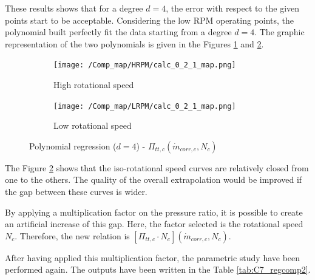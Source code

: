 These results shows that for a degree $d=4$, the error with respect to the given points start to be acceptable.  Considering the low RPM operating points, the polynomial built perfectly fit the data starting from a degree $d=4$. The graphic representation of the two polynomials is given in the Figures \ref{fig:C7_polycomp_P_HRPM} and \ref{fig:C7_polycomp_P_LRPM}.

\begin{figure}[H]
    \centering
    \begin{subfigure}[b]{0.4\textwidth}
        \centering
        \texttt{[image: /Comp\_map/HRPM/calc\_0\_2\_1\_map.png]}
        \caption{High rotational speed}
        \label{fig:C7_polycomp_P_HRPM}
    \end{subfigure}
    \begin{subfigure}[b]{0.4\textwidth}
        \centering
        \texttt{[image: /Comp\_map/LRPM/calc\_0\_2\_1\_map.png]}
        \caption{Low rotational speed}
        \label{fig:C7_polycomp_P_LRPM}
    \end{subfigure}
    \caption{Polynomial regression ($d=4$) - $\Pi_{tt,c}(\dot{m}_{corr,c},N_c)$} \label{fig:C7_polycomp_P}
\end{figure}

The Figure \ref{fig:C7_polycomp_P_LRPM} shows that the iso-rotational speed curves are relatively closed from one to the others. The quality of the overall extrapolation would be improved if the gap between these curves is wider. 

By applying a multiplication factor on the pressure ratio, it is possible to create an artificial increase of this gap. Here, the factor selected is the rotational speed $N_c$. Therefore, the new relation is $[\Pi_{tt,c}\cdot N_c](\dot{m}_{corr,c},N_c)$. 

After having applied this multiplication factor, the parametric study have been performed again. The outputs have been written in the Table \ref{tab:C7_regcomp2}.

